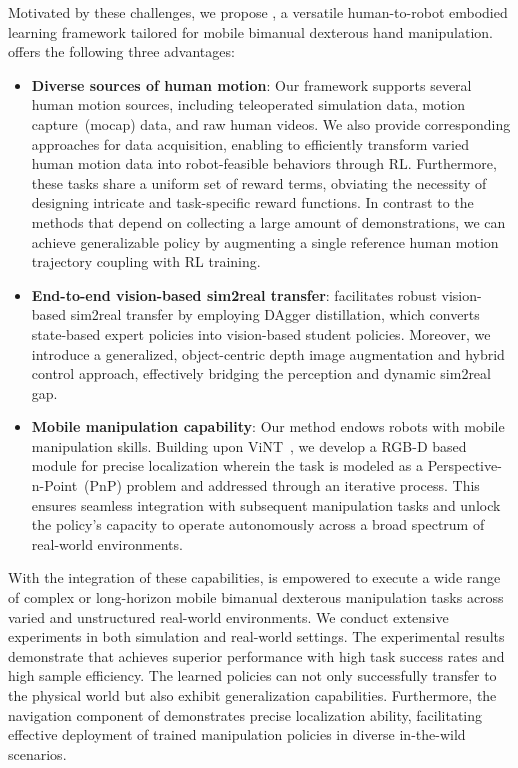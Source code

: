 Motivated by these challenges, we propose \ourshort, a versatile human-to-robot embodied learning framework tailored for mobile bimanual dexterous hand manipulation. \ourshort offers the following three advantages:
\begin{itemize}
    \item \textbf{Diverse sources of human motion}: Our framework supports several human motion sources, including teleoperated simulation data, motion capture~(mocap) data, and raw human videos. We also provide corresponding approaches for data acquisition, enabling \ourshort to efficiently transform varied human motion data into robot-feasible behaviors through RL. Furthermore, these tasks share a uniform set of reward terms, obviating the necessity of designing intricate and task-specific reward functions. In contrast to the methods that depend on collecting a large amount of demonstrations,  we can achieve generalizable policy by augmenting a single reference human motion trajectory coupling with RL training.
    \item \textbf{End-to-end vision-based sim2real transfer}: \ourshort facilitates robust vision-based sim2real transfer by employing DAgger distillation, which converts state-based expert policies into vision-based student policies. Moreover, we introduce a generalized, object-centric depth image augmentation and hybrid control approach, effectively bridging the perception and dynamic sim2real gap.
    \item  \textbf{Mobile manipulation capability}: Our method endows robots with mobile manipulation skills. Building upon ViNT~\cite{shah2023vint}, we develop a RGB-D based module for precise localization wherein the task is modeled as a Perspective-n-Point~(PnP) problem and addressed through an iterative process. This ensures seamless integration with subsequent manipulation tasks and unlock the policy’s capacity to operate autonomously across a broad spectrum of real-world environments.
    
\end{itemize}

With the integration of these capabilities, \ourshort is empowered to execute a wide range of complex or long-horizon mobile bimanual dexterous manipulation tasks across varied and unstructured real-world environments. We conduct extensive experiments in both simulation and real-world settings. The experimental results demonstrate that \ourshort achieves superior performance with high task success rates and high sample efficiency. The learned policies can not only successfully transfer to the physical world but also exhibit generalization capabilities. Furthermore, the navigation component of \ourshort demonstrates precise localization ability, facilitating effective deployment of trained manipulation policies in diverse in-the-wild scenarios.
